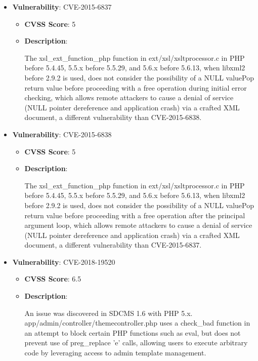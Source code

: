 \documentclass{article}
\begin{document}
\begin{itemize}
        \item \textbf{Vulnerability}: CVE-2015-6837
        \begin{itemize}
            \item \textbf{CVSS Score}:  5 
            \item \textbf{Description}:
            \parbox[t]{0.9\linewidth}{
                \ttfamily The xsl\_ext\_function\_php function in ext/xsl/xsltprocessor.c in PHP before 5.4.45, 5.5.x before 5.5.29, and 5.6.x before 5.6.13, when libxml2 before 2.9.2 is used, does not consider the possibility of a NULL valuePop return value before proceeding with a free operation during initial error checking, which allows remote attackers to cause a denial of service (NULL pointer dereference and application crash) via a crafted XML document, a different vulnerability than CVE-2015-6838.
            }
        \end{itemize}
    
        \item \textbf{Vulnerability}: CVE-2015-6838
        \begin{itemize}
            \item \textbf{CVSS Score}:  5 
            \item \textbf{Description}:
            \parbox[t]{0.9\linewidth}{
                \ttfamily The xsl\_ext\_function\_php function in ext/xsl/xsltprocessor.c in PHP before 5.4.45, 5.5.x before 5.5.29, and 5.6.x before 5.6.13, when libxml2 before 2.9.2 is used, does not consider the possibility of a NULL valuePop return value before proceeding with a free operation after the principal argument loop, which allows remote attackers to cause a denial of service (NULL pointer dereference and application crash) via a crafted XML document, a different vulnerability than CVE-2015-6837.
            }
        \end{itemize}
    
        \item \textbf{Vulnerability}: CVE-2018-19520
        \begin{itemize}
            \item \textbf{CVSS Score}:  6.5 
            \item \textbf{Description}:
            \parbox[t]{0.9\linewidth}{
                \ttfamily An issue was discovered in SDCMS 1.6 with PHP 5.x. app/admin/controller/themecontroller.php uses a check\_bad function in an attempt to block certain PHP functions such as eval, but does not prevent use of preg\_replace 'e' calls, allowing users to execute arbitrary code by leveraging access to admin template management.
            }
        \end{itemize}
    

\end{itemize}
\end{document}
